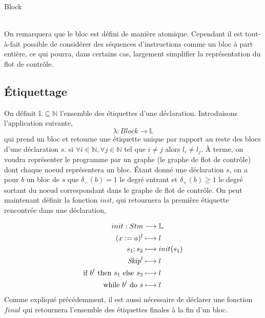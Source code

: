 \documentclass[a4paper, 12pt]{article}
\begin{document}
\begin{dtype}{Block}
	\\
	\\
	\akind{\sskip}
\end{dtype}

On remarquera que le bloc est défini de manière atomique. Cependant il est tout-à-fait possible de considérer des séquences
d'instructions comme un bloc à part entière, ce qui pourra, dans certains cas, largement simplifier la représentation du flot
de contrôle.

\subsection{Étiquettage}
On définit $\mathbb{L}\subseteq\mathbb{N}$ l'ensemble des étiquettes d'une déclaration. Introduisons l'application suivante,
\[
	\lambda: Block \longrightarrow \mathbb{L}
\]
\newline
qui prend un bloc et retourne une étiquette unique par rapport au reste des blocs d'une déclaration $s$.
\newline
\newline
{}
si $\forall i \in \mathbb{N}, \forall j \in \mathbb{N}$ tel que $i \neq j$ alors $l_i \neq l_j$.
\newline
\newline
À terme, on voudra représenter le programme par un graphe (le graphe de flot de contrôle) dont chaque noeud représentera un bloc. 
Étant donné une déclaration $s$, on a pour  $b$ un bloc de $s$ que $\delta_-(b) = 1$ le degré entrant et $\delta_+(b) \ge 1$ 
le degré sortant du noeud correspondant dans le graphe de flot de contrôle.
On peut maintenant définir la fonction $init$, qui retournera la première étiquette rencontrée dans une déclaration,

\begin{align*}
	init : Stm &\longrightarrow \mathbb{L}\\
	({x}\space:=\space{a})^l &\longmapsto l\\
	{s_1}\space;\space{s_2} &\longmapsto init(s_1)\\
	{\textit{Skip}}^l &\longmapsto l\\
	\text{if }{b^l}\text{ then }{s_1}\text{ else }{s_2} &\longmapsto l\\
	\text{while }{b^l}\text{ do }{s} &\longmapsto l
\end{align*}
Comme expliqué précédemment, il est aussi nécessaire de déclarer une fonction $final$ qui retournera l'ensemble des étiquettes finales 
à la fin d'un bloc.
\end{document}
